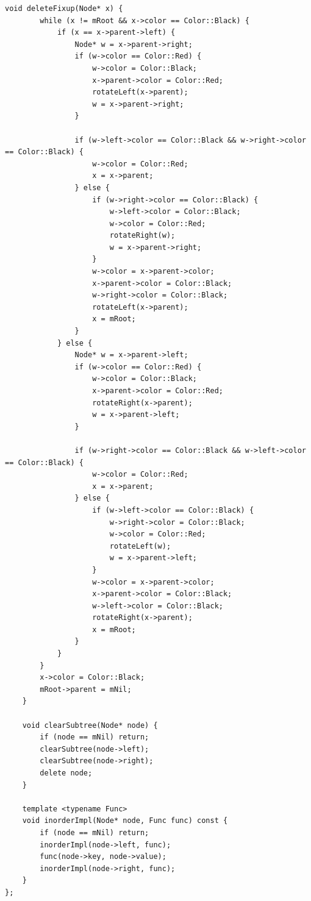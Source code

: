 \documentclass[UTF8,12pt,a4paper]{ctexart}
\begin{document}
\begin{lstlisting}[caption={RBTree.h 源码}]
    void deleteFixup(Node* x) {
        while (x != mRoot && x->color == Color::Black) {
            if (x == x->parent->left) {
                Node* w = x->parent->right;
                if (w->color == Color::Red) {
                    w->color = Color::Black;
                    x->parent->color = Color::Red;
                    rotateLeft(x->parent);
                    w = x->parent->right;
                }

                if (w->left->color == Color::Black && w->right->color == Color::Black) {
                    w->color = Color::Red;
                    x = x->parent;
                } else {
                    if (w->right->color == Color::Black) {
                        w->left->color = Color::Black;
                        w->color = Color::Red;
                        rotateRight(w);
                        w = x->parent->right;
                    }
                    w->color = x->parent->color;
                    x->parent->color = Color::Black;
                    w->right->color = Color::Black;
                    rotateLeft(x->parent);
                    x = mRoot;
                }
            } else {
                Node* w = x->parent->left;
                if (w->color == Color::Red) {
                    w->color = Color::Black;
                    x->parent->color = Color::Red;
                    rotateRight(x->parent);
                    w = x->parent->left;
                }

                if (w->right->color == Color::Black && w->left->color == Color::Black) {
                    w->color = Color::Red;
                    x = x->parent;
                } else {
                    if (w->left->color == Color::Black) {
                        w->right->color = Color::Black;
                        w->color = Color::Red;
                        rotateLeft(w);
                        w = x->parent->left;
                    }
                    w->color = x->parent->color;
                    x->parent->color = Color::Black;
                    w->left->color = Color::Black;
                    rotateRight(x->parent);
                    x = mRoot;
                }
            }
        }
        x->color = Color::Black;
        mRoot->parent = mNil;
    }

    void clearSubtree(Node* node) {
        if (node == mNil) return;
        clearSubtree(node->left);
        clearSubtree(node->right);
        delete node;
    }

    template <typename Func>
    void inorderImpl(Node* node, Func func) const {
        if (node == mNil) return;
        inorderImpl(node->left, func);
        func(node->key, node->value);
        inorderImpl(node->right, func);
    }
};

\end{lstlisting}
\end{document}
